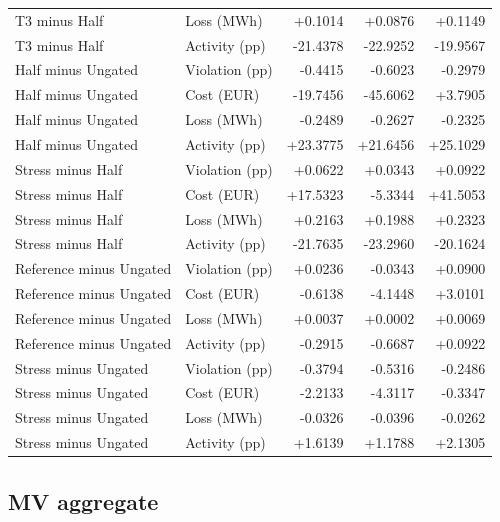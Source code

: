 \documentclass[11pt]{article}
\begin{document}
\begin{longtable}{llrrr}
T3 minus Half & Loss (MWh) & +0.1014 & +0.0876 & +0.1149\\
T3 minus Half & Activity (pp) & -21.4378 & -22.9252 & -19.9567\\
Half minus Ungated & Violation (pp) & -0.4415 & -0.6023 & -0.2979\\
Half minus Ungated & Cost (EUR) & -19.7456 & -45.6062 & +3.7905\\
Half minus Ungated & Loss (MWh) & -0.2489 & -0.2627 & -0.2325\\
Half minus Ungated & Activity (pp) & +23.3775 & +21.6456 & +25.1029\\
Stress minus Half & Violation (pp) & +0.0622 & +0.0343 & +0.0922\\
Stress minus Half & Cost (EUR) & +17.5323 & -5.3344 & +41.5053\\
Stress minus Half & Loss (MWh) & +0.2163 & +0.1988 & +0.2323\\
Stress minus Half & Activity (pp) & -21.7635 & -23.2960 & -20.1624\\
Reference minus Ungated & Violation (pp) & +0.0236 & -0.0343 & +0.0900\\
Reference minus Ungated & Cost (EUR) & -0.6138 & -4.1448 & +3.0101\\
Reference minus Ungated & Loss (MWh) & +0.0037 & +0.0002 & +0.0069\\
Reference minus Ungated & Activity (pp) & -0.2915 & -0.6687 & +0.0922\\
Stress minus Ungated & Violation (pp) & -0.3794 & -0.5316 & -0.2486\\
Stress minus Ungated & Cost (EUR) & -2.2133 & -4.3117 & -0.3347\\
Stress minus Ungated & Loss (MWh) & -0.0326 & -0.0396 & -0.0262\\
Stress minus Ungated & Activity (pp) & +1.6139 & +1.1788 & +2.1305\\
\end{longtable}\normalsize
{}\subsection{MV aggregate}
\end{document}
